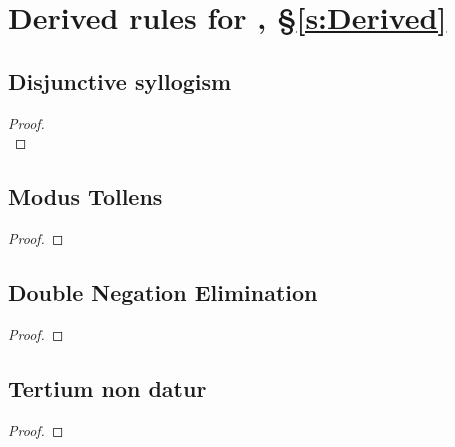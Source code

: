 \section*{Derived rules for \TFL, §\ref{s:Derived}}
\begin{multicols}{2}

\subsection*{Disjunctive syllogism}
\begin{proof}

\\	
\end{proof}



\subsection*{Modus Tollens}

\begin{proof}
	 
\end{proof}

\subsection*{Double Negation Elimination}


	\begin{proof}
	\end{proof}

\subsection*{Tertium non datur}
	\begin{proof}
		\open
		\close
		\open
		\close
	\end{proof}


	
%
%


\end{multicols}
